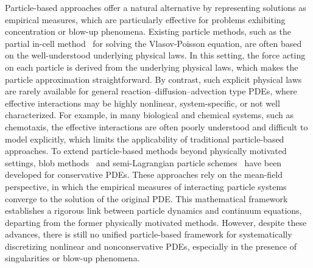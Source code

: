 \documentclass[12pt]{article}
\begin{document}
Particle-based approaches offer a natural alternative by representing solutions as empirical measures, which are particularly effective for problems exhibiting concentration or blow-up phenomena. 
Existing particle methods, such as the partial in-cell method~\cite{birdsall2018plasma, hockney2021computer} for solving the Vlasov-Poisson equation, are often based on the well-understood underlying physical laws. In this setting, the force acting on each particle is derived from the underlying physical laws, which makes the particle approximation straightforward. By contrast, such explicit physical laws are rarely available for general reaction–diffusion–advection type PDEs, where effective interactions may be highly nonlinear, system-specific, or not well characterized. For example, in many biological and chemical systems, such as chemotaxis, the effective interactions are often poorly understood and difficult to model explicitly, which limits the applicability of traditional particle-based approaches.
To extend particle-based methods beyond physically motivated settings, blob methods~\cite{craig2016blob,carrillo2019blob,huang2017error} and semi-Lagrangian particle schemes~\cite{qiu2010conservative,qiu2011conservative,qiu2011positivity} have been developed for conservative PDEs.
These approaches rely on the mean-field perspective, in which the empirical measures of interacting particle systems converge to the solution of the original PDE. This mathematical framework establishes a rigorous link between particle dynamics and continuum equations, departing from the former physically motivated methods. However, despite these advances, there is still no unified particle-based framework for systematically discretizing nonlinear and nonconservative PDEs, especially in the presence of singularities or blow-up phenomena.
\end{document}
